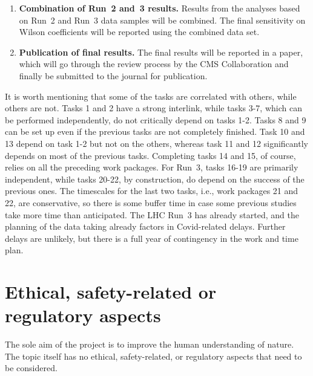 \documentclass[a4paper,11pt]{article}
\begin{document}
\begin{enumerate}[noitemsep,topsep=0pt]
\item {\bf Combination of Run~2 and~3 results.} Results from the analyses based on Run~2 and Run~3 data samples will be combined. The final sensitivity on Wilson coefficients will be reported using the combined data set. 

\item {\bf Publication of final results.} The final results will be reported in a paper, which will go through the review process by the CMS Collaboration and finally be submitted to the journal for publication. 

\end{enumerate}

It is worth mentioning that some of the tasks are correlated with others, while others are not. 
Tasks 1 and 2 have a strong interlink, while tasks 3-7, which can be performed independently, do not critically depend on tasks 1-2. 
Tasks 8 and 9 can be set up even if the previous tasks are not completely finished.
Task 10 and 13 depend on task 1-2 but not on the others, whereas task 11 and 12 significantly depends on most of the previous tasks.
Completing tasks 14 and 15, of course, relies on all the preceding work packages. 
For Run~3, tasks 16-19 are primarily independent, while tasks 20-22, by construction, do depend on the success of the previous ones.
The timescales for the last two tasks, i.e., work packages 21 and 22, are conservative, so there is some buffer time in case some previous studies take more time than anticipated.
The LHC Run~3 has already started, and the planning of the data taking already factors in Covid-related delays. Further delays are unlikely, but there is a full year of contingency in the work and time plan.


\section{Ethical, safety-related or regulatory aspects}

The sole aim of the project is to improve the human understanding of nature. 
The topic itself has no ethical, safety-related, or regulatory aspects that need to be considered.
\end{document}
